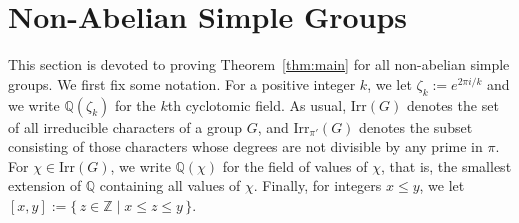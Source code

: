 \documentclass[12pt]{amsart}
\theoremstyle{definition}
\numberwithin{equation}{section}
\newcommand{\Irr}{{\mathrm {Irr}}}
\newcommand{\QQ}{{\mathbb Q}}
\newcommand{\ZZ}{{\mathbb Z}}
\newcommand{\Al}{\textup{\textsf{A}}}
\newcommand{\Sy}{\textup{\textsf{S}}}
\begin{document}
%


\section{Non-Abelian Simple Groups}

This %
section is devoted to proving Theorem~\ref{thm:main} for %
all
non-abelian simple %
groups. We first fix some notation. For a
positive integer $k$, we %
let $\zeta_k:=e^{2\pi i/k}$ and %
we write $\QQ(\zeta_k)$ for the $k$th
cyclotomic field. As usual, $\Irr(G)$ denotes
the set of all irreducible characters of a group $G$, and
$\Irr_{\pi'}(G)$ denotes the subset consisting of those characters
whose degrees are not divisible by any prime in $\pi$. For
$\chi\in\Irr(G)$, we write $\QQ(\chi)$ for the field of values of
$\chi$, that is, %
the smallest extension of $\QQ$ containing all
values of $\chi$. Finally, for integers $x\le y$, we let
$[x,y]:=\{\,z\in\ZZ \mid x\le z\le y\,\}$.
\end{document}

